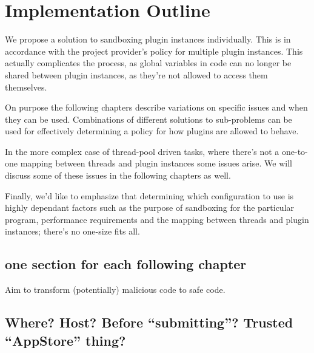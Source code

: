 \chapter {Implementation Outline}

We propose a solution to sandboxing plugin instances individually. This is in
accordance with the project provider's policy for multiple plugin instances.
This actually complicates the process, as global variables in code can no
longer be shared between plugin instances, as they're not allowed to access
them themselves.

On purpose the following chapters describe variations on specific issues and
when they can be used. Combinations of different solutions to sub-problems can
be used for effectively determining a policy for how plugins are allowed to
behave.

In the more complex case of thread-pool driven tasks, where there's not a
one-to-one mapping between threads and plugin instances some issues arise. We
will discuss some of these issues in the following chapters as well.

Finally, we'd like to emphasize that determining which configuration to use is
highly dependant factors such as the purpose of sandboxing for the particular
program, performance requirements and the mapping between threads and plugin
instances; there's no one-size fits all.

\section {one section for each following chapter}

Aim to transform (potentially) malicious code to safe code.

\section {Where? Host? Before ``submitting''? Trusted ``AppStore'' thing?}


